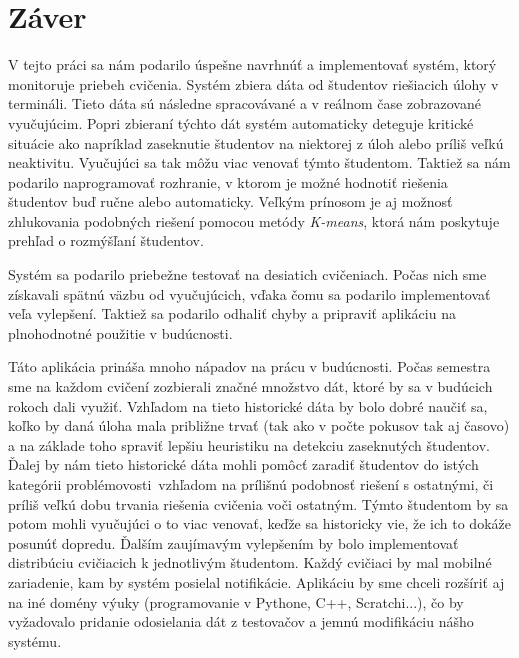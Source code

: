 \chapter*{Záver}  %

V tejto práci sa nám podarilo úspešne navrhnúť a implementovať systém, ktorý monitoruje
priebeh cvičenia. Systém zbiera dáta od študentov riešiacich úlohy v termináli.
Tieto dáta sú následne spracovávané a v reálnom čase zobrazované vyučujúcim.
Popri zbieraní týchto dát systém automaticky deteguje kritické situácie ako napríklad
zaseknutie študentov na niektorej z úloh alebo príliš veľkú neaktivitu. Vyučujúci
sa tak môžu viac venovať týmto študentom. Taktiež sa nám podarilo naprogramovať
rozhranie, v ktorom je možné hodnotiť riešenia študentov buď ručne alebo automaticky.
Veľkým prínosom je aj možnosť zhlukovania podobných riešení pomocou metódy
\textit{K-means}, ktorá nám poskytuje prehľad o rozmýšľaní študentov.

Systém sa podarilo priebežne testovať na desiatich cvičeniach.
Počas nich sme získavali spätnú
väzbu od vyučujúcich, vďaka čomu sa podarilo implementovať veľa vylepšení.
Taktiež sa podarilo odhaliť
chyby a pripraviť aplikáciu na plnohodnotné použitie v budúcnosti.

Táto aplikácia prináša mnoho nápadov na prácu v budúcnosti. Počas semestra
sme na každom cvičení zozbierali značné množstvo dát, ktoré by sa v budúcich rokoch
dali využiť.
Vzhľadom na tieto historické dáta by bolo dobré naučiť sa, koľko by daná úloha mala
približne trvať (tak ako v počte pokusov tak aj časovo) a na základe toho spraviť lepšiu
heuristiku na detekciu zaseknutých študentov.
Ďalej by nám tieto historické dáta mohli pomôcť zaradiť študentov do istých
\glqq kategórii problémovosti\grqq~vzhľadom na prílišnú podobnosť riešení s ostatnými,
či príliš veľkú dobu trvania riešenia cvičenia voči ostatným. Týmto študentom by sa
potom mohli vyučujúci o to viac venovať, keďže sa historicky vie, že ich to dokáže
posunúť dopredu. Ďalším zaujímavým vylepšením by bolo implementovať distribúciu cvičiacich
k jednotlivým
študentom. Každý cvičiaci by mal mobilné zariadenie, kam by systém posielal
notifikácie. Aplikáciu by sme chceli rozšíriť aj na iné domény výuky
(programovanie v Pythone, C++, Scratchi...), čo by vyžadovalo pridanie odosielania
dát z testovačov a jemnú modifikáciu nášho systému.




